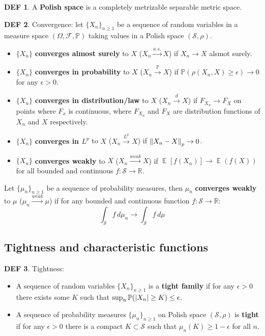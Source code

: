 \documentclass[hidelinks,11pt]{article}
\theoremstyle{definition}
\newtheorem*{defin}{DEF}
\theoremstyle{dotless}
\theoremstyle{remark}
\DeclareMathOperator{\E}{\mathbb{E}}
\DeclareMathOperator{\1}{\mathbf{1}}
\begin{document}
\begin{defin}
A \textbf{Polish space} is a completely metrizable separable metric space.
\end{defin}

\begin{defin}Convergence: let $\{X_n\}_{n\geq1}$ be a sequence of random variables in a measure space $(\Omega,\mathcal{F},\mathbb{P})$ taking values in a Polish space $(\mathcal{S},\rho)$.\begin{itemize}
    \item $\{X_n\}$ \textbf{converges almost surely} to $X$ ($X_n\xrightarrow{a.s.}X$) if $X_n\to X$ alsmot surely.
    \item $\{X_n\}$ \textbf{converges in probability} to $X$ ($X_n\xrightarrow{\mathbb{P}}X$) if $\mathbb{P}(\rho(X_n,X)\geq\epsilon)\to0$ for any $\epsilon>0$.
    \item $\{X_n\}$ \textbf{converges in distribution/law} to $X$ ($X_n\xrightarrow{d}X$) if $F_{X_n}\to F_X$ on points where $F_x$ is continuous, where $F_{X_n}$ and $F_X$ are distribution functions of $X_n$ and $X$ respectively.
    \item $\{X_n\}$ \textbf{converges in $L^p$} to $X$ ($X_n\xrightarrow{L^p}X$) if $\norm{X_n-X}_p\to0$.
    \item $\{X_n\}$ \textbf{converges weakly} to $X$ ($X_n\xrightarrow{weak}X$) if $\E[f(X_n)]\to\E(f(X))$ for all bounded and continuous $f:\mathcal{S}\to\mathbb{R}$.
\end{itemize}
Let $\{\mu_n\}_{n\geq1}$ be a sequence of probability measures, then $\mu_n$ \textbf{converges weakly} to $\mu$ ($\mu_n\xrightarrow{weak}\mu$) if for any bounded and continuous function $f:\mathcal{S}\to\mathbb{R}$:
\[\int_\mathcal{S}f\,d\mu_n\to\int_\mathcal{S}f\,d\mu\]
\end{defin}

\subsection{Tightness and characteristic functions}

\begin{defin}Tightness:\begin{itemize}
    \item A sequence of random variables $\{X_n\}_{n\geq1}$ is a \textbf{tight family} if for any $\epsilon>0$ there exists some $K$ such that $\sup_n\mathbb{P}(\abs{X_n}\geq K)\leq\epsilon$.
    \item A sequence of probability measures $\{\mu_n\}_{n\geq1}$ on Polish space $(\mathcal{S},\rho)$ is \textbf{tight} if for any $\epsilon>0$ there is a compact $K\subset\mathcal{S}$ such that $\mu_n(K)\geq1-\epsilon$ for all $n$.
\end{itemize}

\end{defin}
\end{document}
